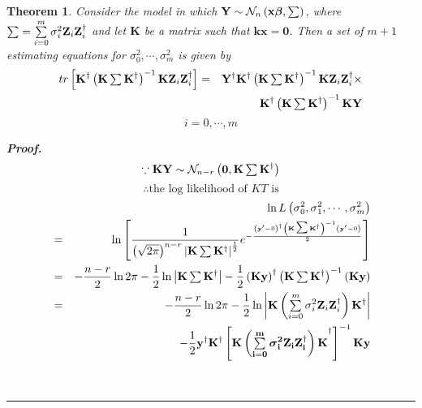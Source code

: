 \documentclass{article}
\newtheorem{theorem}{Theorem}
\newenvironment{proof}[1][Proof]{\noindent\textbf{#1.} }{\ \rule{0.5em}{0.5em}}
\begin{document}
\begin{theorem}
Consider the model in which $\mathbf{Y}\sim \mathcal{N}_{n}\left( \mathbf{%
x\beta },\tsum \right) $, where $\tsum =\tsum\limits_{i=0}^{m}\sigma _{i}^{2}%
\mathbf{Z}_{i}\mathbf{Z}_{i}^{\dagger }$ and let $\mathbf{K}$ be a matrix
such that $\mathbf{kx}=\mathbf{0}$. Then a set of $m+1$ estimating equations
for $\sigma _{0}^{2},\cdots ,\sigma _{m}^{2}$ is given by%
\begin{eqnarray*}
tr\left[ \mathbf{K}^{\dagger }\left( \mathbf{K}\tsum \mathbf{K}^{\dagger
}\right) ^{-1}\mathbf{KZ}_{i}\mathbf{Z}_{i}^{\dagger }\right] &=&\mathbf{Y}%
^{\dagger }\mathbf{K}^{\dagger }\left( \mathbf{K}\tsum \mathbf{K}^{\dagger
}\right) ^{-1}\mathbf{KZ}_{i}\mathbf{Z}_{i}^{\dagger }\times \\
&&\mathbf{K}^{\dagger }\left( \mathbf{K}\tsum \mathbf{K}^{\dagger }\right)
^{-1}\mathbf{KY}
\end{eqnarray*}%
\begin{equation*}
i=0,\cdots ,m
\end{equation*}

\begin{proof}
\begin{equation*}
\because \mathbf{KY}\sim \mathcal{N}_{n-r}\left( \mathbf{0},\mathbf{K}\mathop{\textstyle \sum } 
\mathbf{K}^{\dagger }\right) 
\end{equation*}%
\begin{equation*}
\therefore \text{the log likelihood of }KT\text{ is}
\end{equation*}%
\begin{eqnarray*}
&&\ln L\left( \sigma _{0}^{2},\sigma _{1}^{2},\cdots ,\sigma _{m}^{2}\right) 
\\
&=&\ln \left[ \frac{1}{\left( \sqrt{2\pi }\right) ^{n-r}\left\vert \mathbf{K}%
\tsum \mathbf{K}^{\dagger }\right\vert ^{\frac{1}{2}}}{\LARGE e}^{-\frac{%
\left( \mathbf{y}^{\prime }-0\right) ^{\dagger }\left( \mathbf{K}\tsum 
\mathbf{K}^{\dagger }\right) ^{-1}\left( \mathbf{y}^{\prime }-0\right) }{2}}%
\right]  \\
&=&-\frac{n-r}{2}\ln 2\pi -\frac{1}{2}\ln \left\vert \mathbf{K}\tsum \mathbf{%
K}^{\dagger }\right\vert -\frac{1}{2}\left( \mathbf{Ky}\right) ^{\dagger
}\left( \mathbf{K}\tsum \mathbf{K}^{\dagger }\right) ^{-1}\left( \mathbf{Ky}%
\right)  \\
&=&-\frac{n-r}{2}\ln 2\pi -\frac{1}{2}\ln \left\vert \mathbf{K}\left(
\tsum\limits_{i=0}^{m}\sigma _{i}^{2}\mathbf{Z}_{i}\mathbf{Z}_{i}^{\dagger
}\right) \mathbf{K}^{\dagger }\right\vert  \\
&&-\frac{1}{2}\mathbf{y}^{\dagger }\mathbf{K}^{\dagger }\left[ \mathbf{%
K\left( \tsum\limits_{i=0}^{m}\sigma _{i}^{2}\mathbf{Z}_{i}\mathbf{Z}%
_{i}^{\dagger }\right) K}^{\dagger }\right] ^{-1}\mathbf{Ky}
\end{eqnarray*}


\end{proof}
\end{theorem}
\end{document}
